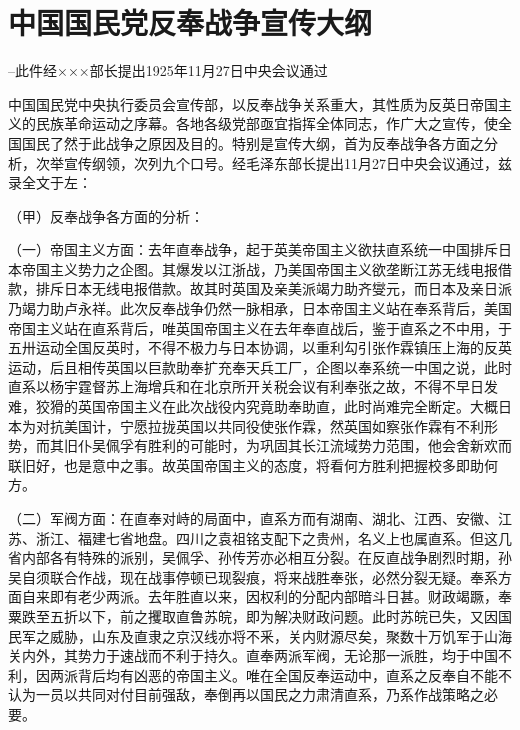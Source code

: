 \section[中国国民党反奉战争宣传大纲]{中国国民党反奉战争宣传大纲}


--此件经×××部长提出1925年11月27日中央会议通过

中国国民党中央执行委员会宣传部，以反奉战争关系重大，其性质为反英日帝国主义的民族革命运动之序幕。各地各级党部亟宜指挥全体同志，作广大之宣传，使全国国民了然于此战争之原因及目的。特别是宣传大纲，首为反奉战争各方面之分析，次举宣传纲领，次列九个口号。经毛泽东部长提出11月27日中央会议通过，兹录全文于左：

（甲）反奉战争各方面的分析：

（一）帝国主义方面：去年直奉战争，起于英美帝国主义欲扶直系统一中国排斥日本帝国主义势力之企图。其爆发以江浙战，乃美国帝国主义欲垄断江苏无线电报借款，排斥日本无线电报借款。故其时英国及亲美派竭力助齐燮元，而日本及亲日派乃竭力助卢永祥。此次反奉战争仍然一脉相承，日本帝国主义站在奉系背后，美国帝国主义站在直系背后，唯英国帝国主义在去年奉直战后，鉴于直系之不中用，于五卅运动全国反英时，不得不极力与日本协调，以重利勾引张作霖镇压上海的反英运动，后且相传英国以巨款助奉扩充奉天兵工厂，企图以奉系统一中国之说，此时直系以杨宇霆督苏上海增兵和在北京所开关税会议有利奉张之故，不得不早日发难，狡猾的英国帝国主义在此次战役内究竟助奉助直，此时尚难完全断定。大概日本为对抗美国计，宁愿拉拢英国以共同役使张作霖，然英国如察张作霖有不利形势，而其旧仆吴佩孚有胜利的可能时，为巩固其长江流域势力范围，他会舍新欢而联旧好，也是意中之事。故英国帝国主义的态度，将看何方胜利把握校多即助何方。

（二）军阀方面：在直奉对峙的局面中，直系方而有湖南、湖北、江西、安徽、江苏、浙江、福建七省地盘。四川之袁祖铭支配下之贵州，名义上也属直系。但这几省内部各有特殊的派别，吴佩孚、孙传芳亦必相互分裂。在反直战争剧烈时期，孙吴自须联合作战，现在战事停顿已现裂痕，将来战胜奉张，必然分裂无疑。奉系方面自来即有老少两派。去年胜直以来，因权利的分配内部暗斗日甚。财政竭蹶，奉粟跌至五折以下，前之攫取直鲁苏皖，即为解决财政问题。此时苏皖已失，又因国民军之威胁，山东及直隶之京汉线亦将不釆，关内财源尽矣，聚数十万饥军于山海关内外，其势力于速战而不利于持久。直奉两派军阀，无论那一派胜，均于中国不利，因两派背后均有凶恶的帝国主义。唯在全国反奉运动中，直系之反奉自不能不认为一员以共同对付目前强敌，奉倒再以国民之力肃清直系，乃系作战策略之必要。

